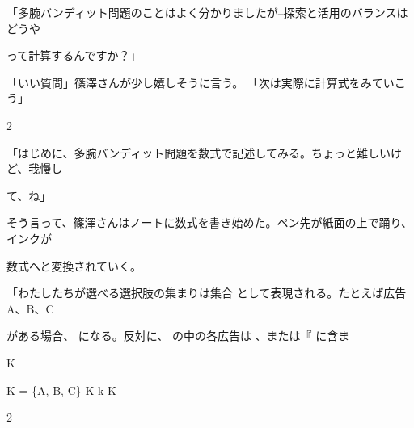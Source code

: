 「多腕バンディット問題のことはよく分かりましたが--探索と活⽤のバランスはどうや\par
って計算するんですか？」\par
「いい質問」篠澤さんが少し嬉しそうに⾔う。 「次は実際に計算式をみていこう」\par
2\par
「はじめに、多腕バンディット問題を数式で記述してみる。ちょっと難しいけど、我慢し\par
て、ね」\par
そう⾔って、篠澤さんはノートに数式を書き始めた。ペン先が紙⾯の上で踊り、インクが\par
数式へと変換されていく。\par
「わたしたちが選べる選択肢の集まりは集合 として表現される。たとえば広告A、B、C\par
がある場合、 になる。反対に、 の中の各広告は 、または『 に含ま\par
K\par
K = \{A, B, C\} K k K\par
2\par

